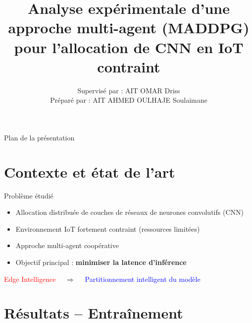 \documentclass[aspectratio=169]{beamer}
\title{Analyse expérimentale d’une approche multi-agent (MADDPG) pour l’allocation de CNN en IoT contraint}
\author{Supervisé par : AIT OMAR Driss\\
            Préparé par : AIT AHMED OULHAJE Soulaimane}
\institute{Master AIDC — FST Béni Mellal}
\begin{document}
\begin{frame}
  \titlepage
\end{frame}

\begin{frame}{Plan de la présentation}
\tableofcontents[hideallsubsections]
\end{frame}

\section{Contexte et état de l'art}

\begin{frame}{Problème étudié}
\begin{itemize}
    \item Allocation distribuée de couches de réseaux de neurones convolutifs (CNN)
    \item Environnement IoT fortement contraint (ressources limitées)
    \item Approche multi-agent coopérative
    \item Objectif principal : \textbf{minimiser la latence d'inférence}
\end{itemize}

\centering
{\large \textcolor{red}{Edge Intelligence} $\quad\Rightarrow\quad$ \textcolor{blue}{Partitionnement intelligent du modèle}}
\end{frame}

\section{Résultats – Entraînement}
\end{document}
